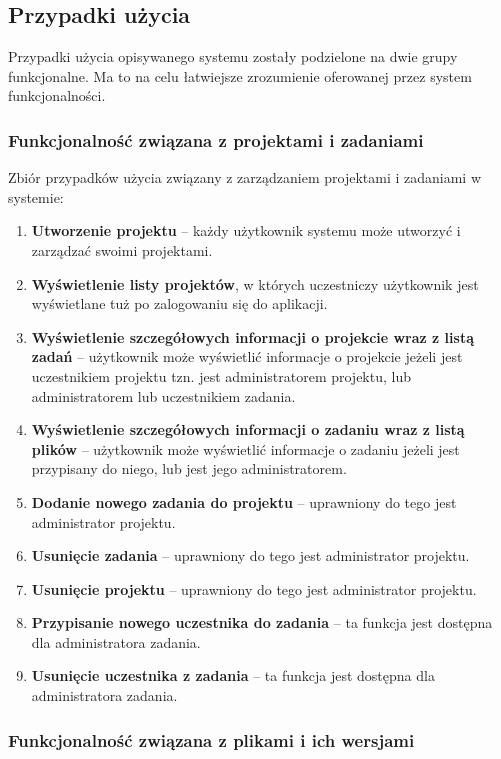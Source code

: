 \subsection{Przypadki użycia}

Przypadki użycia opisywanego systemu zostały podzielone na dwie grupy funkcjonalne.
Ma to na celu łatwiejsze zrozumienie oferowanej przez system funkcjonalności.

\subsubsection{Funkcjonalność związana z projektami i zadaniami}

Zbiór przypadków użycia związany z zarządzaniem projektami i zadaniami w systemie:
\begin{enumerate}
    \item \textbf{Utworzenie projektu} -- każdy użytkownik systemu może utworzyć i zarządzać swoimi projektami.
    \item \textbf{Wyświetlenie listy projektów}, w których uczestniczy użytkownik jest wyświetlane tuż po zalogowaniu się do aplikacji.
    \item \textbf{Wyświetlenie szczegółowych informacji o projekcie wraz z listą zadań} -- użytkownik może wyświetlić informacje o projekcie jeżeli jest uczestnikiem projektu tzn. jest administratorem projektu, lub administratorem lub uczestnikiem zadania.
    \item \textbf{Wyświetlenie szczegółowych informacji o zadaniu wraz z listą plików} -- użytkownik może wyświetlić informacje o zadaniu jeżeli jest przypisany do niego, lub jest jego administratorem.
    \item \textbf{Dodanie nowego zadania do projektu} -- uprawniony do tego jest administrator projektu.
    \item \textbf{Usunięcie zadania} -- uprawniony do tego jest administrator projektu.
    \item \textbf{Usunięcie projektu} -- uprawniony do tego jest administrator projektu.
    \item \textbf{Przypisanie nowego uczestnika do zadania} -- ta funkcja jest dostępna dla administratora zadania.
    \item \textbf{Usunięcie uczestnika z zadania} -- ta funkcja jest dostępna dla administratora zadania.
\end{enumerate}

\subsubsection{Funkcjonalność związana z plikami i ich wersjami}


